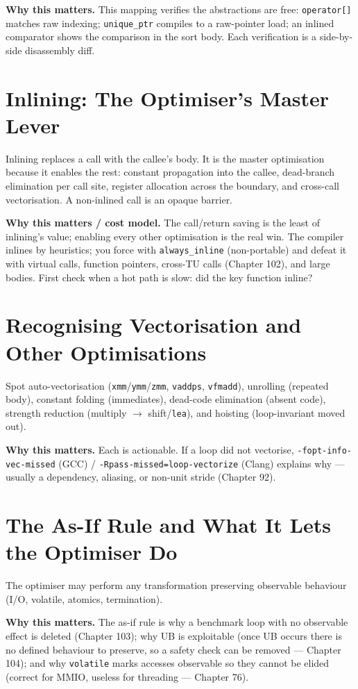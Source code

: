 \textbf{Why this matters.} This mapping verifies the abstractions are free: \texttt{operator[]} matches raw indexing; \texttt{unique\_ptr} compiles to a raw-pointer load; an inlined comparator shows the comparison in the sort body. Each verification is a side-by-side disassembly diff.

\section{Inlining: The Optimiser's Master Lever}
Inlining replaces a call with the callee's body. It is the master optimisation because it enables the rest: constant propagation into the callee, dead-branch elimination per call site, register allocation across the boundary, and cross-call vectorisation. A non-inlined call is an opaque barrier.

\textbf{Why this matters / cost model.} The call/return saving is the least of inlining's value; enabling every other optimisation is the real win. The compiler inlines by heuristics; you force with \texttt{always\_inline} (non-portable) and defeat it with virtual calls, function pointers, cross-TU calls (Chapter 102), and large bodies. First check when a hot path is slow: did the key function inline?

\section{Recognising Vectorisation and Other Optimisations}
Spot auto-vectorisation (\texttt{xmm}/\texttt{ymm}/\texttt{zmm}, \texttt{vaddps}, \texttt{vfmadd}), unrolling (repeated body), constant folding (immediates), dead-code elimination (absent code), strength reduction (multiply $\to$ shift/\texttt{lea}), and hoisting (loop-invariant moved out).

\textbf{Why this matters.} Each is actionable. If a loop did not vectorise, \texttt{-fopt-info-vec-missed} (GCC) / \texttt{-Rpass-missed=loop-vectorize} (Clang) explains why --- usually a dependency, aliasing, or non-unit stride (Chapter 92).

\section{The As-If Rule and What It Lets the Optimiser Do}
The optimiser may perform any transformation preserving observable behaviour (I/O, volatile, atomics, termination).

\textbf{Why this matters.} The as-if rule is why a benchmark loop with no observable effect is deleted (Chapter 103); why UB is exploitable (once UB occurs there is no defined behaviour to preserve, so a safety check can be removed --- Chapter 104); and why \texttt{volatile} marks accesses observable so they cannot be elided (correct for MMIO, useless for threading --- Chapter 76).

